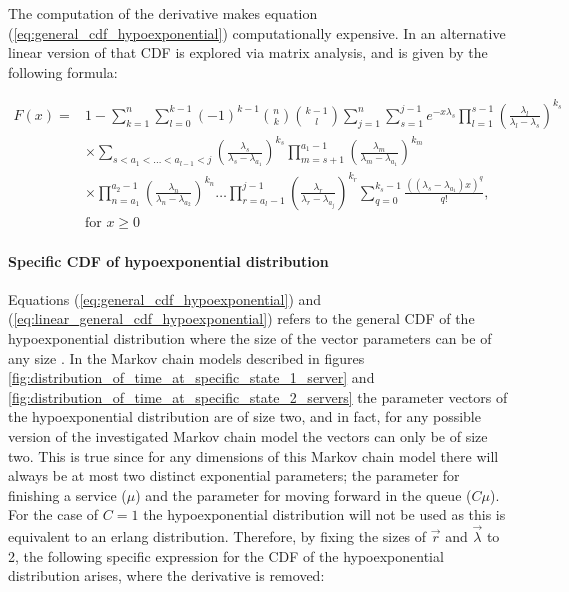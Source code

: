 The computation of the derivative makes equation 
(\ref{eq:general_cdf_hypoexponential}) computationally expensive. 
In \cite{Legros2015} an alternative linear version of that CDF is explored via 
matrix analysis, and is given by the following formula:

\begin{equation} \label{eq:linear_general_cdf_hypoexponential}
    \begin{split}
        F(x) = &1 - \sum_{k=1}^{n} \sum_{l=0}^{k-1} (-1)^{k-1} \binom{n}{k} 
            \binom{k-1}{l} \sum_{j=1}^{n} \sum_{s=1}^{j-1} e^{-x \lambda_s} 
            \prod_{l=1}^{s-1} \left( \frac{\lambda_l}{\lambda_l - \lambda_s} \right)
            ^ {k_s} \\
        & \times \sum_{s < a_1 < \dots < a_{l-1} < j} 
            \left( \frac{\lambda_s}{\lambda_s - \lambda_{a_1}} \right) ^ {k_s}
            \prod_{m=s+1}^{a_1-1} \left( \frac{\lambda_m}{\lambda_m - 
            \lambda_{a_1}}\right) ^ {k_m} \\  
        & \times \prod_{n=a_1}^{a_2-1} \left( \frac{\lambda_n}{\lambda_n - 
            \lambda_{a_2}}\right) ^ {k_n} \dots 
            \prod_{r=a_l-1}^{j-1} \left( \frac{\lambda_r}{\lambda_r - 
            \lambda_{a_j}}\right) ^ {k_r}  
            \sum_{q=0}^{k_s - 1} \frac{((\lambda_s - \lambda_{a_1})x)^q}{q!}, \\
        & \text{for } x \geq 0
    \end{split}
\end{equation}


\paragraph{Specific CDF of hypoexponential distribution}
Equations (\ref{eq:general_cdf_hypoexponential}) and 
(\ref{eq:linear_general_cdf_hypoexponential}) refers to the general CDF of the
hypoexponential distribution where the size of the vector parameters can be of
any size \cite{Favaro2010}.
In the Markov chain models described in figures 
\ref{fig:distribution_of_time_at_specific_state_1_server} and 
\ref{fig:distribution_of_time_at_specific_state_2_servers} the parameter vectors 
of the hypoexponential distribution are of size two, and in fact, for any 
possible version of the investigated Markov chain model the vectors can only be 
of size two.
This is true since for any dimensions of this Markov chain model there will 
always be at most two distinct exponential parameters; the parameter for 
finishing a service (\(\mu\)) and the parameter for moving forward in the queue 
(\(C \mu\)). 
For the case of \(C=1\) the hypoexponential distribution will not be 
used as this is equivalent to an erlang distribution.
Therefore, by fixing the sizes of \(\vec{r}\) and \(\vec{\lambda}\) to 2, the 
following specific expression for the CDF of the hypoexponential distribution
arises, where the derivative is removed:


